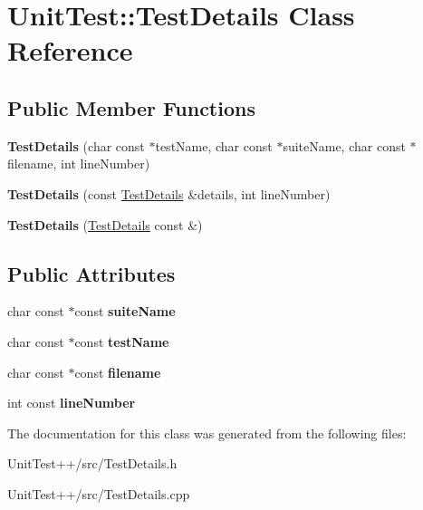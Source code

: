\hypertarget{classUnitTest_1_1TestDetails}{\section{Unit\-Test\-:\-:Test\-Details Class Reference}
\label{classUnitTest_1_1TestDetails}
}
\subsection*{Public Member Functions}
\begin{DoxyCompactItemize}
\item 
\hypertarget{classUnitTest_1_1TestDetails_a9317f51ef0865b042c8180ea691eccaa}{{\bfseries Test\-Details} (char const $\ast$test\-Name, char const $\ast$suite\-Name, char const $\ast$filename, int line\-Number)}\label{classUnitTest_1_1TestDetails_a9317f51ef0865b042c8180ea691eccaa}

\item 
\hypertarget{classUnitTest_1_1TestDetails_a780f29f93d4e7016ee3426ad5ea62cb3}{{\bfseries Test\-Details} (const \hyperlink{classUnitTest_1_1TestDetails}{Test\-Details} \&details, int line\-Number)}\label{classUnitTest_1_1TestDetails_a780f29f93d4e7016ee3426ad5ea62cb3}

\item 
\hypertarget{classUnitTest_1_1TestDetails_afc3836360e570a6c6a1b696c2ee2f73d}{{\bfseries Test\-Details} (\hyperlink{classUnitTest_1_1TestDetails}{Test\-Details} const \&)}\label{classUnitTest_1_1TestDetails_afc3836360e570a6c6a1b696c2ee2f73d}

\end{DoxyCompactItemize}
\subsection*{Public Attributes}
\begin{DoxyCompactItemize}
\item 
\hypertarget{classUnitTest_1_1TestDetails_a4ab111817a7c2e627b77ecfc91e1bcf0}{char const $\ast$const {\bfseries suite\-Name}}\label{classUnitTest_1_1TestDetails_a4ab111817a7c2e627b77ecfc91e1bcf0}

\item 
\hypertarget{classUnitTest_1_1TestDetails_a88446b0c9bf84e3cb7d33b6584c9077a}{char const $\ast$const {\bfseries test\-Name}}\label{classUnitTest_1_1TestDetails_a88446b0c9bf84e3cb7d33b6584c9077a}

\item 
\hypertarget{classUnitTest_1_1TestDetails_a6e704305c58485f37fcabfe1f7c35723}{char const $\ast$const {\bfseries filename}}\label{classUnitTest_1_1TestDetails_a6e704305c58485f37fcabfe1f7c35723}

\item 
\hypertarget{classUnitTest_1_1TestDetails_aa55e2a9270e7b3b4da8169761376ee0c}{int const {\bfseries line\-Number}}\label{classUnitTest_1_1TestDetails_aa55e2a9270e7b3b4da8169761376ee0c}

\end{DoxyCompactItemize}


The documentation for this class was generated from the following files\-:\begin{DoxyCompactItemize}
\item 
Unit\-Test++/src/Test\-Details.\-h\item 
Unit\-Test++/src/Test\-Details.\-cpp\end{DoxyCompactItemize}
